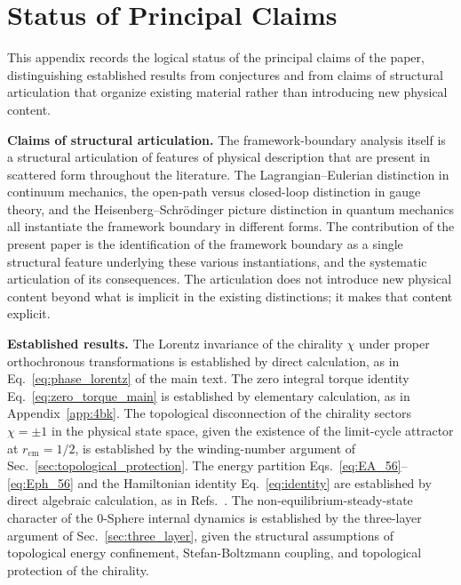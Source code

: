 \documentclass[%
 reprint, amsmath,amssymb, aps, prb, ]{revtex4-2}
\numberwithin{equation}{section}
\begin{document}
\appendix

\section{Status of Principal Claims}
\label{app:claims}

This appendix records the logical status of the principal claims of the paper, distinguishing established results from conjectures and from claims of structural articulation that organize existing material rather than introducing new physical content.

\textbf{Claims of structural articulation.} The framework-boundary analysis itself is a structural articulation of features of physical description that are present in scattered form throughout the literature. The Lagrangian--Eulerian distinction in continuum mechanics, the open-path versus closed-loop distinction in gauge theory, and the Heisenberg--Schr\"odinger picture distinction in quantum mechanics all instantiate the framework boundary in different forms. The contribution of the present paper is the identification of the framework boundary as a single structural feature underlying these various instantiations, and the systematic articulation of its consequences. The articulation does not introduce new physical content beyond what is implicit in the existing distinctions; it makes that content explicit.

\textbf{Established results.} The Lorentz invariance of the chirality $\chi$ under proper orthochronous transformations is established by direct calculation, as in Eq.~\eqref{eq:phase_lorentz} of the main text. The zero integral torque identity Eq.~\eqref{eq:zero_torque_main} is established by elementary calculation, as in Appendix~\ref{app:4bk}. The topological disconnection of the chirality sectors $\chi = \pm 1$ in the physical state space, given the existence of the limit-cycle attractor at $r_{\mathrm{cm}} = 1/2$, is established by the winding-number argument of Sec.~\ref{sec:topological_protection}. The energy partition Eqs.~\eqref{eq:EA_56}--\eqref{eq:Eph_56} and the Hamiltonian identity Eq.~\eqref{eq:identity} are established by direct algebraic calculation, as in Refs.~\cite{hanamura01, hanamura33}. The non-equilibrium-steady-state character of the 0-Sphere internal dynamics is established by the three-layer argument of Sec.~\ref{sec:three_layer}, given the structural assumptions of topological energy confinement, Stefan-Boltzmann coupling, and topological protection of the chirality.
\end{document}
